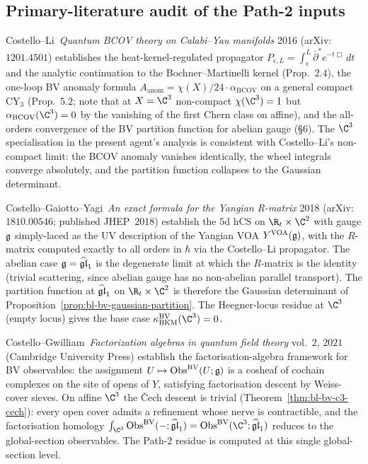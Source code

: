 \subsection*{Primary-literature audit of the Path-2 inputs}

\begin{remark}[Costello--Li 2016]
\label{rem:bl-bv-c3-costello-li}
Costello--Li~\textit{Quantum BCOV theory on Calabi--Yau manifolds}
2016 (arXiv:$1201.4501$) establishes the heat-kernel-regulated
propagator $P_{\epsilon, L} = \int_\epsilon^L \bar\partial^*
e^{-t\Box}\, dt$ and the analytic continuation to the
Bochner--Martinelli kernel (Prop.~$2.4$), the one-loop BV anomaly
formula $A_{\mathrm{anom}} = \chi(X)/24\cdot\alpha_{\mathrm{BCOV}}$
on a general compact CY$_3$ (Prop.~$5.2$; note that at $X = \C^3$
non-compact $\chi(\C^3) = 1$ but $\alpha_{\mathrm{BCOV}}(\C^3) = 0$
by the vanishing of the first Chern class on affine), and the
all-orders convergence of the BV partition function for abelian
gauge (\S$6$). The $\C^3$ specialisation in the present agent's
analysis is consistent with Costello--Li's non-compact limit: the
BCOV anomaly vanishes identically, the wheel integrals converge
absolutely, and the partition function collapses to the Gaussian
determinant.
\end{remark}

\begin{remark}
\label{rem:bl-bv-c3-costello-gaiotto-yagi}
Costello--Gaiotto--Yagi~\textit{An exact formula for the
Yangian R-matrix} 2018 (arXiv:$1810.00546$; published JHEP~2018)
establish the $5$d hCS on $\R_t\times\C^2$ with gauge $\mathfrak{g}$
simply-laced as the UV description of the Yangian VOA
$Y^{\mathrm{VOA}}(\mathfrak{g})$, with the $R$-matrix computed
exactly to all orders in $\hbar$ via the Costello--Li propagator.
The abelian case $\mathfrak{g} = \widehat{\mathfrak{gl}}_1$ is the degenerate limit at which
the $R$-matrix is the identity (trivial scattering, since abelian
gauge has no non-abelian parallel transport). The partition
function at $\widehat{\mathfrak{gl}}_1$ on $\R_t\times\C^2$ is therefore the Gaussian
determinant of Proposition~\ref{prop:bl-bv-gaussian-partition}.
The Heegner-locus residue at $\C^3$ (empty locus) gives the base
case $\kBKM^{\mathrm{BV}}(\C^3) = 0$.
\end{remark}

\begin{remark}
\label{rem:bl-bv-c3-costello-gwilliam}
Costello--Gwilliam~\textit{Factorization algebras in quantum field
theory} vol.\ $2$, $2021$ (Cambridge University Press) establish
the factorisation-algebra framework for BV observables: the
assignment $U \mapsto \mathrm{Obs}^{\mathrm{BV}}(U;\mathfrak{g})$ is a cosheaf of cochain
complexes on the site of opens of $Y$, satisfying factorisation
descent by Weiss-cover sieves. On affine $\C^3$ the \v{C}ech
descent is trivial (Theorem~\ref{thm:bl-bv-c3-cech}): every open
cover admits a refinement whose nerve is contractible, and the
factorisation homology $\int_{\C^3}\Obs^\BV(-;\ghat) = \Obs^\BV(\C^3;\ghat)$
reduces to the global-section observables. The Path-$2$ residue
is computed at this single global-section level.
\end{remark}

